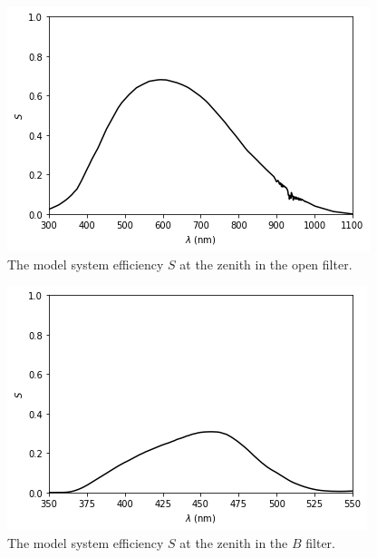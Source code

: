 \begin{figure}
\begin{center}
\includegraphics[width=0.9\linewidth]{figures/huitzi-S-open.png}
\medskip
\caption{The model system efficiency $S$ at the zenith in the open filter.}
\end{center}
\end{figure}

\begin{figure}
\begin{center}
\includegraphics[width=0.9\linewidth]{figures/huitzi-S-JC-B.png}
\medskip
\caption{The model system efficiency $S$ at the zenith in the $B$ filter.}
\end{center}
\end{figure}

